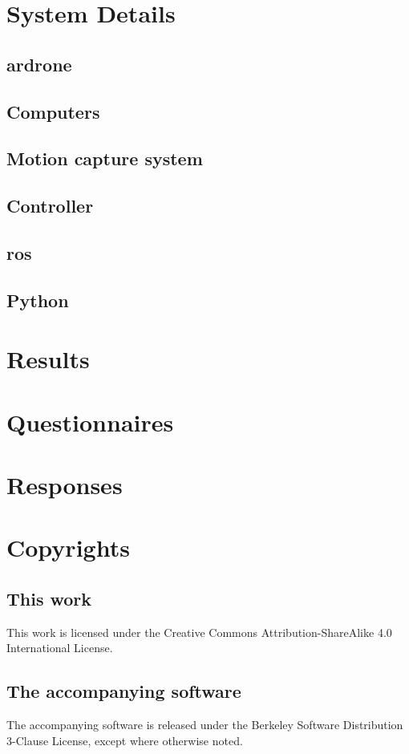 \appendix
\chapter{System Details}
\section{\gls{ardrone}}
\section{Computers}  %
\section{Motion capture system}
\section{Controller}
\section{\gls{ros}}  %
\section{Python}

\chapter{Results}

\chapter{Questionnaires}

\chapter{Responses}

\chapter{Copyrights}
\section{This work}
This work is licensed under the Creative Commons Attribution-ShareAlike 4.0 International License.
\section{The accompanying software}
The accompanying software is released under the Berkeley Software Distribution 3-Clause License, except where otherwise noted. 

